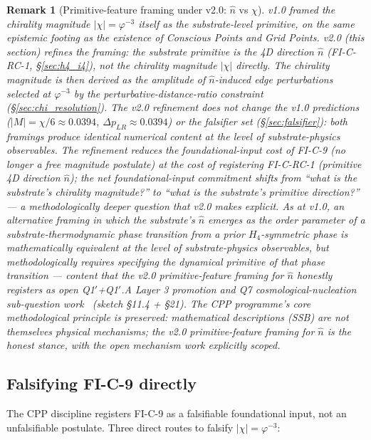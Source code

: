 \documentclass[11pt,letterpaper]{article}
\newtheorem{remark}[theorem]{Remark}
\newcommand{\phig}{\varphi}
\newcommand{\DeltapLR}{\Delta p_{LR}}
\newcommand{\Hfour}{H_4}
\begin{document}
\begin{remark}[Primitive-feature framing under v2.0: $\hat{n}$ vs $\chi$]\label{rem:ssb_vs_initial}
v1.0 framed the chirality magnitude $|\chi| = \phig^{-3}$ itself as the substrate-level primitive, on the same epistemic footing as the existence of Conscious Points and Grid Points. v2.0 (this section) refines the framing: the substrate primitive is the 4D direction $\hat{n}$ (FI-C-RC-1, \S\ref{sec:h4_i4}), not the chirality magnitude $|\chi|$ directly. The chirality magnitude is then derived as the amplitude of $\hat{n}$-induced edge perturbations selected at $\phig^{-3}$ by the perturbative-distance-ratio constraint (\S\ref{sec:chi_resolution}). The v2.0 refinement does not change the v1.0 predictions ($|M| = \chi/6 \approx 0.0394$, $\DeltapLR \approx 0.0394$) or the falsifier set (\S\ref{sec:falsifier}): both framings produce identical numerical content at the level of substrate-physics observables. The refinement reduces the foundational-input cost of FI-C-9 (no longer a free magnitude postulate) at the cost of registering FI-C-RC-1 (primitive 4D direction $\hat{n}$); the net foundational-input commitment shifts from ``what is the substrate's chirality magnitude?'' to ``what is the substrate's primitive direction?'' --- a methodologically deeper question that v2.0 makes explicit. As at v1.0, an alternative framing in which the substrate's $\hat{n}$ emerges as the order parameter of a substrate-thermodynamic phase transition from a prior $\Hfour$-symmetric phase is mathematically equivalent at the level of substrate-physics observables, but methodologically requires specifying the dynamical primitive of that phase transition --- content that the v2.0 primitive-feature framing for $\hat{n}$ honestly registers as open Q1$'$+Q1$'$.A Layer 3 promotion and Q7 cosmological-nucleation sub-question work~\cite{abshier_capotauro_chiral_mechanism_sketch} (sketch \S11.4 + \S21). The CPP programme's core methodological principle is preserved: mathematical descriptions (SSB) are not themselves physical mechanisms; the v2.0 primitive-feature framing for $\hat{n}$ is the honest stance, with the open mechanism work explicitly scoped.
\end{remark}

\subsection{Falsifying FI-C-9 directly}\label{sec:fi_c9_direct_falsifiers}

The CPP discipline registers FI-C-9 as a falsifiable foundational input, not an unfalsifiable postulate. Three direct routes to falsify $|\chi| = \phig^{-3}$:
\end{document}
